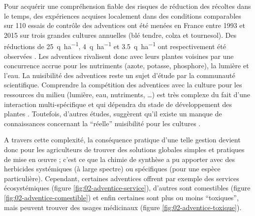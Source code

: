 \documentclass[../thesis.tex]{subfiles}
\begin{document}
    \par Pour acquérir une compréhension fiable des risques de réduction des récoltes dans le temps, des expériences acquises localement dans des conditions comparables sur 110 essais de contrôle des adventices ont été menées en France entre 1993 et ​​2015 sur trois grandes cultures annuelles (blé tendre, colza et tournesol). Des réductions de \SI{25}{q\per\hectare}, \SI{4}{q\per\hectare} et \SI{3,5}{q\per\hectare} ont respectivement été observées \cite{cordeau2016nuisibilite}. Les adventices rivalisent donc avec leurs plantes voisines par une concurrence accrue pour les nutriments (azote, potasse, phosphore), la lumière et l'eau. La nuisibilité des adventices reste un sujet d'étude par la communauté scientifique. Comprendre la compétition des adventices avec la culture pour les ressources du milieu (lumière, eau, nutriments, \dots) est très complexe du fait d'une interaction multi-spécifique et qui dépendra du stade de développement des plantes \cite{morison2008comment, colbach2021florsys}. Toutefois, d'autres études, suggèrent qu'il existe un manque de connaissances concernant la ``réelle'' nuisibilité pour les cultures \cite{bendaoud2020semis, jouan:hal-03611906}.
    
    \par A travers cette complexité, la conséquence pratique d'une telle gestion devient donc pour les agriculteurs de trouver des solutions globales simples et pratiques de mise en œuvre ; c'est ce que la chimie de synthèse a pu apporter avec des herbicides systémiques (à large spectre) ou spécifiques (pour une espèce particulière). Cependant, certaines adventices offrent par exemple des services écosystémiques (figure \ref{fig:02-adventice-service}), d'autres sont comestibles (figure \ref{fig:02-adventice-comestible}) et enfin certaines sont plus ou moins ``toxiques'', mais peuvent trouver des usages médicinaux (figure \ref{fig:02-adventice-toxique}).
    
    
    
    
    \newpage
    \null \vfill
    
\end{document}
